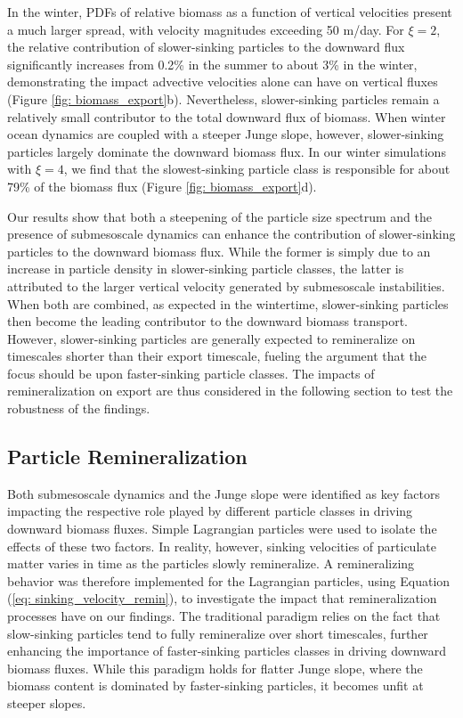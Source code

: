 \documentclass[article,linenumbers]{agujournal2019}
\begin{document}
	In the winter, PDFs of relative biomass as a function of vertical velocities present a much larger spread, with velocity magnitudes exceeding 50 m/day. For $\xi = 2$, the relative contribution of slower-sinking particles to the downward flux significantly increases from 0.2\% in the summer to about 3\% in the winter, demonstrating the impact advective velocities alone can have on vertical fluxes (Figure \ref{fig: biomass_export}b). Nevertheless, slower-sinking particles remain a relatively small contributor to the total downward flux of biomass. When winter ocean dynamics are coupled with a steeper Junge slope, however, slower-sinking particles largely dominate the downward biomass flux. In our winter simulations with $\xi = 4$, we find that the slowest-sinking particle class is responsible for about 79\% of the biomass flux (Figure \ref{fig: biomass_export}d).

	Our results show that both a steepening of the particle size spectrum and the presence of submesoscale dynamics can enhance the contribution of slower-sinking particles to the downward biomass flux. While the former is simply due to an increase in particle density in slower-sinking particle classes, the latter is attributed to the larger vertical velocity generated by submesoscale instabilities. When both are combined, as expected in the wintertime, slower-sinking particles then become the leading contributor to the downward biomass transport. However, slower-sinking particles are generally expected to remineralize on timescales shorter than their export timescale, fueling the argument that the focus should be upon faster-sinking particle classes. The impacts of remineralization on export are thus considered in the following section to test the robustness of the findings.

	\subsection{Particle Remineralization}
	\label{sec: results_remin}

	Both submesoscale dynamics and the Junge slope were identified as key factors impacting the respective role played by different particle classes in driving downward biomass fluxes. Simple Lagrangian particles were used to isolate the effects of these two factors. In reality, however, sinking velocities of particulate matter varies in time as the particles slowly remineralize. A remineralizing behavior was therefore implemented for the Lagrangian particles, using Equation (\ref{eq: sinking_velocity_remin}), to investigate the impact that remineralization processes have on our findings. The traditional paradigm relies on the fact that slow-sinking particles tend to fully remineralize over short timescales, further enhancing the importance of faster-sinking particles classes in driving downward biomass fluxes. While this paradigm holds for flatter Junge slope, where the biomass content is dominated by faster-sinking particles, it becomes unfit at steeper slopes.
\end{document}
